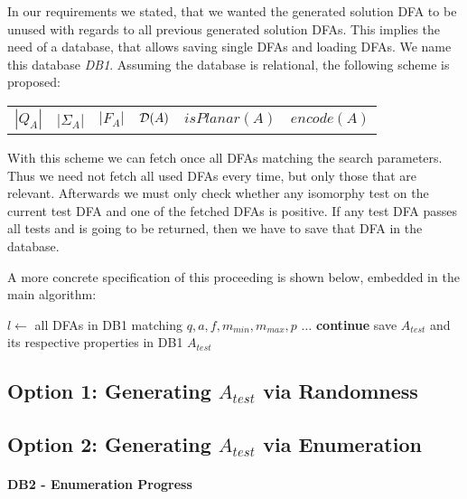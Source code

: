 In our requirements we stated, that we wanted the generated solution DFA to be unused with regards to all previous generated solution DFAs. This implies the need of a database, that allows saving single DFAs and loading DFAs. We name this database \emph{DB1}. Assuming the database is relational, the following scheme is proposed:
\begin{center}
	\begin{tabular}{c c c c c c}
	$|Q_A|$ & |$\Sigma_A$| & $|F_A|$ & $\mathcal{D}(A)$ & $isPlanar(A)$ & $encode(A)$
	\end{tabular}
\end{center}
With this scheme we can fetch once all DFAs matching the search parameters. Thus we need not fetch all used DFAs every time, but only those that are relevant. Afterwards we must only check whether any isomorphy test on the current test DFA and one of the fetched DFAs is positive. If any test DFA passes all tests and is going to be returned, then we have to save that DFA in the database.

A more concrete specification of this proceeding is shown below, embedded in the main algorithm:
\vspace{0.2cm}
\begin{algorithmic}[1]
		\State $l \gets$ all DFAs in DB1 matching $q, a, f, m_{min}, m_{max}, p$
			\State $\ldots$
					\State \textbf{continue}
				\EndIf
			\EndFor
			\State save $A_{test}$ and its respective properties in DB1
			\State\Return $A_{test}$
		\EndWhile
	\EndFunction
\end{algorithmic}
\vspace{0.2cm}

\subsection{Option 1: Generating $A_{test}$ via Randomness}

\subsection{Option 2: Generating $A_{test}$ via Enumeration}

\paragraph*{DB2 - Enumeration Progress}

